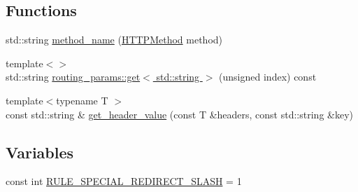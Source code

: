 \subsection*{Functions}
\begin{DoxyCompactItemize}
\item 
std\-::string \hyperlink{namespacecrow_a2e95f26db5041c7f322bd38c2de6a6b1}{method\-\_\-name} (\hyperlink{namespacecrow_a02d34072d2b3415aee5e7287edd06ae1}{H\-T\-T\-P\-Method} method)
\item 
{\footnotesize template$<$$>$ }\\std\-::string \hyperlink{namespacecrow_a95142b051d7358769267df504e39a3b9}{routing\-\_\-params\-::get$<$ std\-::string $>$} (unsigned index) const 
\item 
{\footnotesize template$<$typename T $>$ }\\const std\-::string \& \hyperlink{namespacecrow_ac0940ae1e094df6107d3a2604537279a}{get\-\_\-header\-\_\-value} (const T \&headers, const std\-::string \&key)
\end{DoxyCompactItemize}
\subsection*{Variables}
\begin{DoxyCompactItemize}
\item 
const int \hyperlink{namespacecrow_a73062c5f5d45cb57eb32fd8a3f916132}{R\-U\-L\-E\-\_\-\-S\-P\-E\-C\-I\-A\-L\-\_\-\-R\-E\-D\-I\-R\-E\-C\-T\-\_\-\-S\-L\-A\-S\-H} = 1
\end{DoxyCompactItemize}


